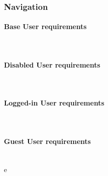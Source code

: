\subsubsection{Navigation}
\paragraph{Base User requirements}\mbox{}\\

\clearpage
\paragraph{Disabled User requirements}\mbox{}\\

\clearpage
\paragraph{Logged-in User requirements}\mbox{}\\

\clearpage
\paragraph{Guest User requirements}\mbox{}\\
e
